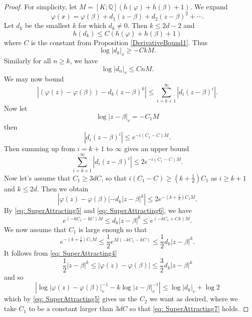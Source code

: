 \documentclass[10pt,a4paper]{amsart}
\newcommand{\bb}{\mathbb}
\newcommand{\vphi}{\varphi}
\begin{document}
\begin{proof}
For simplicity, let $M = [K;\bb{Q}](h(\vphi) + h(\beta)+1)$. We expand 
$$\vphi(x) = \vphi(\beta) + d_1(z-\beta) + d_2(z-\beta)^2 + \cdots.$$
Let $d_k$ be the smallest $k$ for which $d_k \not = 0$. Then $k \leq 2d-2$ and 
$$h(d_k) \leq C(h(\vphi) + h(\beta)+1)$$
where $C$ is the constant from Proposition \ref{DerivativeBound1}. Thus 
\begin{equation} \label{eq: SuperAttracting6}
\log |d_k|_v \geq - CkM.
\end{equation}
Similarly for all $n \geq k$, we have 
\begin{equation} \label{eq: SuperAttracting5}
\log |d_n|_v \leq Cn M.
\end{equation}
We may now bound 
$$\left|\left(\vphi(z) - \vphi(\beta) \right)  - d_k (z-\beta)^k \right| \leq \sum_{i=k+1}^{\infty} \left|d_i (z-\beta)^i \right|.$$
Now let
$$\log |z-\beta|_v = -C_1 M$$
then
$$|d_i (z-\beta)^i| \leq e^{-i (C_1 - C) M}.$$
Then summing up from $i=k+1$ to $\infty$ gives an upper bound 
$$\sum_{i=k+1}^{\infty} \left|d_i (z-\beta)^i \right| \leq 2 e^{-i(C_1 - C)M}.$$
Now let's assume that $C_1 \geq 3d C$, so that $i(C_1 - C) \geq (k+ \frac{1}{d})C_1$ as $i \geq k+1$ and $k \leq 2d$. Then we obtain 
\begin{equation} \label{eq: SuperAttracting4}
\left|\vphi(z) - \vphi(\beta)| - d_k |z-\beta|^k \right| \leq 2e^{-(k + \frac{1}{d})C_1 M}.
\end{equation}
By \eqref{eq: SuperAttracting5} and \eqref{eq: SuperAttracting6}, we have 
$$e^{(-kC_1 - kC)M} \leq d_k|z-\beta|^k \leq e^{(-kC_1 + Ck)M}.$$
We now assume that $C_1$ is large enough so that
\begin{equation} \label{eq: SuperAttracting7}
e^{-(k+\frac{1}{d})C_1 M} \leq \frac{1}{2} e^{M(-kC_1 - kC)} \leq \frac{1}{2} d_k |z-\beta|^k.
\end{equation}
It follows from \eqref{eq: SuperAttracting4}
$$ \frac{1}{2} |z-\beta|^k \leq |\vphi(z) - \vphi(\beta)| \leq \frac{3}{2} d_k |z-\beta|^k$$
and so
$$\left|\log |\vphi(z) - \vphi(\beta)|_v ^{-1} - k \log |z-\beta|^{-1}_v \right| \leq \log |d_k|_v + \log 2$$
which by \eqref{eq: SuperAttracting5} gives us the $C_2$ we want as desired, where we take $C_1$ to be a constant larger than $3dC$ so that \eqref{eq: SuperAttracting7} holds. 
\end{proof}
\end{document}
